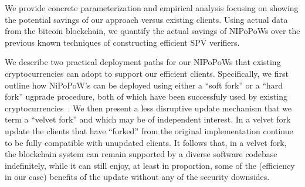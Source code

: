 We provide concrete parameterization and empirical analysis focusing on showing
the potential savings of our approach versus existing clients. Using actual data
from the bitcoin blockchain, we quantify the actual savings of NIPoPoWs over the
previous known techniques of constructing efficient SPV verifiers.

We describe two practical deployment paths for our NIPoPoWs that existing
cryptocurrencies can adopt to support our efficient clients. Specifically, we
first outline how NiPoPoW's can be deployed using either a ``soft fork'' or a
``hard fork'' ugprade procedure, both of which have been successfuly used by
existing cryptocurrencies~\cite{sok}. We then present a less disruptive update
mechanism that we term a ``velvet fork'' and which may be of independent
interest. In a velvet fork update the clients that have ``forked'' from the
original implementation continue to be fully compatible with unupdated clients.
It follows that, in a velvet fork, the blockchain system can remain supported by
a diverse software codebase indefinitely, while it can still enjoy, at least in
proportion, some of the (efficiency in our case) benefits of the update without
any of the security downsides.
